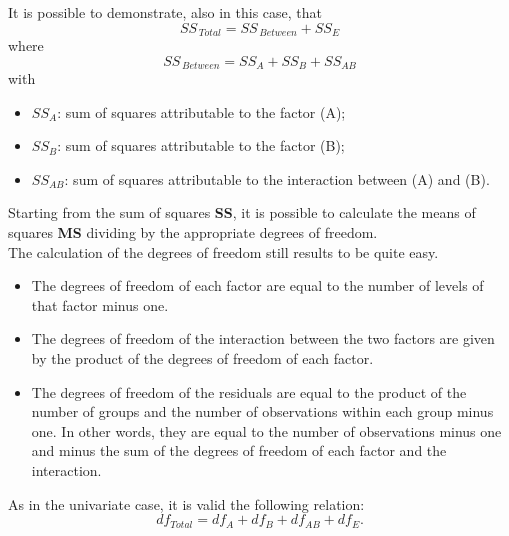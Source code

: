 \begin{frame}
  \vspace*{.25cm}
  It is possible to demonstrate, also in this case, that
  $$ SS_{\,Total}=SS_{\,Between}+SS_{E} $$
  where
  $$ SS_{\,Between}=SS_A+SS_B+SS_{AB} $$
  with
  \begin{itemize}
    \item $SS_A$: sum of squares attributable to the factor (A);
    \item $SS_B$: sum of squares attributable to the factor (B);
    \item $SS_{AB}$: sum of squares attributable to the interaction between (A) and (B).
  \end{itemize}	
\end{frame}

\begin{frame}
  Starting from the sum of squares \textbf{SS}, it is possible to calculate the means of squares \textbf{MS} dividing by the appropriate degrees of freedom.\\
  \vspace*{.15cm}
  The calculation of the degrees of freedom still results to be quite easy.\\
  \begin{itemize}
    \item The degrees of freedom of each factor are equal to the number of levels of that factor minus one.
    \item The degrees of freedom of the interaction between the two factors are given by the product of the degrees of freedom of each factor.
    \item The degrees of freedom of the residuals are equal to the product of the number of groups and the number of observations within each group minus one. In other words, they are equal to the number of observations minus one and minus the sum of the degrees of freedom of each factor and the interaction.
  \end{itemize}
  As in the univariate case, it is valid the following relation:
  $$ df_{Total}=df_A+ df_B+df_{AB}+df_{E} \mbox{.} $$
\end{frame}

